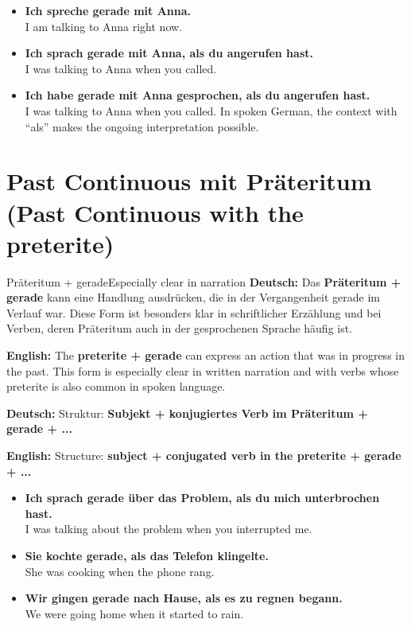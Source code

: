 \documentclass[a4paper,11pt]{article}
\newcommand{\GermanText}[1]{\textbf{Deutsch: }#1\par}
\newcommand{\EnglishText}[1]{{\small\color{SoftGray}\textbf{English: }#1\par}}
\newcommand{\ExampleItem}[2]{\item \textbf{#1}\\{\small\color{SoftGray}#2}}
\begin{document}
        \begin{exbox}
            \begin{itemize}
                \ExampleItem{Ich spreche gerade mit Anna.}{I am talking to Anna right now.}
                \ExampleItem{Ich sprach gerade mit Anna, als du angerufen hast.}{I was talking to Anna when you called.}
                \ExampleItem{Ich habe gerade mit Anna gesprochen, als du angerufen hast.}{I was talking to Anna when you called. In spoken German, the context with ``als'' makes the ongoing interpretation possible.}
            \end{itemize}
        \end{exbox}

\section{Past Continuous mit Präteritum \textnormal{(Past Continuous with the preterite)}}

        \begin{grammarentry}{Präteritum + gerade}{Especially clear in narration}
            \GermanText{Das \textbf{Präteritum + gerade} kann eine Handlung ausdrücken, die in der Vergangenheit gerade im Verlauf war. Diese Form ist besonders klar in schriftlicher Erzählung und bei Verben, deren Präteritum auch in der gesprochenen Sprache häufig ist.}
            \EnglishText{The \textbf{preterite + gerade} can express an action that was in progress in the past. This form is especially clear in written narration and with verbs whose preterite is also common in spoken language.}

            \GermanText{Struktur: \textbf{Subjekt + konjugiertes Verb im Präteritum + gerade + ...}}
            \EnglishText{Structure: \textbf{subject + conjugated verb in the preterite + gerade + ...}}
        \end{grammarentry}

        \begin{exbox}
            \begin{itemize}
                \ExampleItem{Ich sprach gerade über das Problem, als du mich unterbrochen hast.}{I was talking about the problem when you interrupted me.}
                \ExampleItem{Sie kochte gerade, als das Telefon klingelte.}{She was cooking when the phone rang.}
                \ExampleItem{Wir gingen gerade nach Hause, als es zu regnen begann.}{We were going home when it started to rain.}
            \end{itemize}
        \end{exbox}
\end{document}
